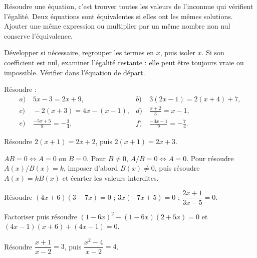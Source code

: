 \begin{keypoint}[Définition]
Résoudre une équation, c'est trouver toutes les valeurs de l'inconnue qui vérifient l'égalité. Deux équations sont équivalentes si elles ont les mêmes solutions. Ajouter une même expression ou multiplier par un même nombre non nul conserve l'équivalence.
\end{keypoint}
\begin{method}
Développer si nécessaire, regrouper les termes en $x$, puis isoler $x$. Si son coefficient est nul, examiner l'égalité restante : elle peut être toujours vraie ou impossible. Vérifier dans l'équation de départ.
\end{method}
\begin{example}Résoudre :
\begin{align*}
a)&\ 5x-3=2x+9,& b)&\ 3(2x-1)=2(x+4)+7,\\
c)&\ -2(x+3)=4x-(x-1),&d)&\ \frac{x+2}{3}=x-1,\\
e)&\ \frac{-5x+5}{8}=-\frac34,&f)&\ \frac{-3x-1}{9}=-\frac74.
\end{align*}\end{example}
\begin{example}Résoudre $2(x+1)=2x+2$, puis $2(x+1)=2x+3$.\end{example}

\begin{keypoint}[Propriétés]
$AB=0\iff A=0$ ou $B=0$. Pour $B\ne0$, $A/B=0\iff A=0$. Pour résoudre $A(x)/B(x)=k$, imposer d'abord $B(x)\ne0$, puis résoudre $A(x)=kB(x)$ et écarter les valeurs interdites.
\end{keypoint}
\begin{example}Résoudre $(4x+6)(3-7x)=0$ ; $3x(-7x+5)=0$ ; $\dfrac{2x+1}{3x-5}=0$.\end{example}
\begin{example}Factoriser puis résoudre $(1-6x)^2-(1-6x)(2+5x)=0$ et $(4x-1)(x+6)+(4x-1)=0$.\end{example}
\begin{example}Résoudre $\dfrac{x+1}{x-2}=3$, puis $\dfrac{x^2-4}{x-2}=4$.\end{example}

